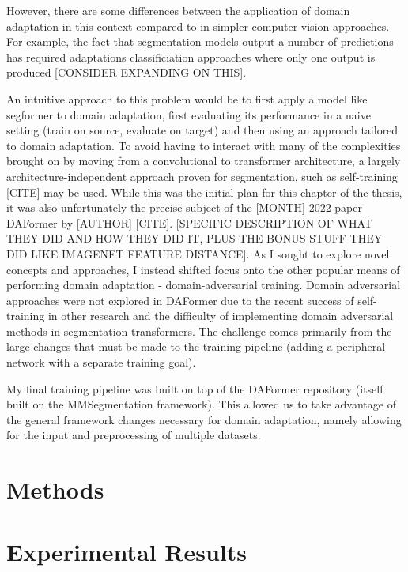 \documentclass[a4paper,12pt]{report}
\begin{document}
    However, there are some differences between the application of domain adaptation in this context compared to in simpler computer vision approaches. For example, the fact that segmentation models output a number of predictions has required adaptations classificiation approaches where only one output is produced [CONSIDER EXPANDING ON THIS].

    An intuitive approach to this problem would be to first apply a model like segformer to domain adaptation, first evaluating its performance in a naive setting (train on source, evaluate on target) and then using an approach tailored to domain adaptation. To avoid having to interact with many of the complexities brought on by moving from a convolutional to transformer architecture, a largely architecture-independent approach proven for segmentation, such as self-training [CITE] may be used. While this was the initial plan for this chapter of the thesis, it was also unfortunately the precise subject of the [MONTH] 2022 paper DAFormer by [AUTHOR] [CITE]. [SPECIFIC DESCRIPTION OF WHAT THEY DID AND HOW THEY DID IT, PLUS THE BONUS STUFF THEY DID LIKE IMAGENET FEATURE DISTANCE]. As I sought to explore novel concepts and approaches, I instead shifted focus onto the other popular means of performing domain adaptation - domain-adversarial training. Domain adversarial approaches were not explored in DAFormer due to the recent success of self-training in other research and the difficulty of implementing domain adversarial methods in segmentation transformers. The challenge comes primarily from the large changes that must be made to the training pipeline (adding a peripheral network with a separate training goal).

    My final training pipeline was built on top of the DAFormer repository (itself built on the MMSegmentation framework). This allowed us to take advantage of the general framework changes necessary for domain adaptation, namely allowing for the input and preprocessing of multiple datasets.


\section{Methods}

\section{Experimental Results}
\end{document}
